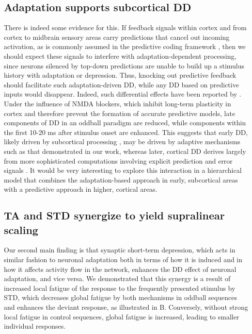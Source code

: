 \documentclass[9pt,lineno,onehalfspacing]{elife}
\begin{document}
\subsection{Adaptation supports subcortical DD}

There is indeed some evidence for this. If feedback signals within cortex and from cortex to midbrain sensory areas carry predictions that cancel out incoming activation, as is commonly assumed in the predictive coding framework \citep{Rao1999-xc, Friston2005-jz, Carbajal2018-sd}, then we should expect these signals to interfere with adaptation-dependent processing, since neurons silenced by top-down predictions are unable to build up a stimulus history with adaptation or depression. Thus, knocking out predictive feedback should facilitate such adaptation-driven DD, while any DD based on predictive inputs would disappear. Indeed, such differential effects have been reported by \cite{Harms2018-bg}. Under the influence of NMDA blockers, which inhibit long-term plasticity in cortex and therefore prevent the formation of accurate predictive models, late components of DD in an oddball paradigm are reduced, while components within the first 10-20 ms after stimulus onset are enhanced. This suggests that early DD, likely driven by subcortical processing \citep{Grimm2012-tb, Parras2017-fp, Font-Alaminos2020-fs}, may be driven by adaptive mechanisms such as that demonstrated in our work, whereas later, cortical DD derives largely from more sophisticated computations involving explicit prediction and error signals \citep{Schlossmacher2022-zv, Grimm2016-fr}. It would be very interesting to explore this interaction in a hierarchical model that combines the adaptation-based approach in early, subcortical areas with a predictive approach \citep{Wacongne2012-ah, Wacongne2016-ht, Hertag2020-kc} in higher, cortical areas. 

\subsection{TA and STD synergize to yield supralinear scaling}

Our second main finding is that synaptic short-term depression, which acts in similar fashion to neuronal adaptation both in terms of how it is induced and in how it affects activity flow in the network, enhances the DD effect of neuronal adaptation, and vice versa. We demonstrated that this synergy is a result of increased local fatigue of the response to the frequently presented stimulus by STD, which decreases global fatigue by both mechanisms in oddball sequences and enhances the deviant response, as illustrated in B. Conversely, without strong local fatigue in control sequences, global fatigue is increased, leading to smaller individual responses.
\end{document}
